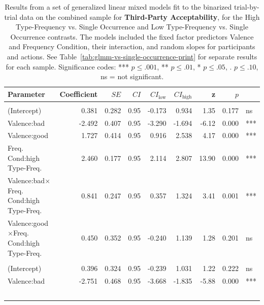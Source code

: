 \documentclass[
]{article}
\begin{document}
\begin{table}
\centering\centering
\caption{\label{tab:glmm-vs-single-occurrence-combined-print-third-party-acceptability}Results from a set of generalized linear mixed models fit to the binarized trial-by-trial data on the combined sample for \textbf{Third-Party Acceptability}, for the High Type-Frequency vs. Single Occurrence and Low Type-Frequency vs. Single Occurrence contrasts. The models included the fixed factor predictors Valence and Frequency Condition, their interaction, and random slopes for participants and actions. See Table~\ref{tab:glmm-vs-single-occurrence-print} for separate results for each sample. Significance codes: *** $p \leq .001$, ** $p \leq .01$, * $p \leq .05$, . $p \leq .10$, ns = not significant.}
\centering
\begin{tabular}[t]{lrrrrrrrl}
\toprule
Parameter & Coefficient & $\mathit{SE}$ & $C$$I$ & $CI_{\text{low}}$ & $CI_{\text{high}}$ & z & $p$ &  \\
\midrule
\addlinespace[0.3em]
\multicolumn{9}{l}{\textbf{High Type-Frequency (vs. Single Occurrence)}}\\
\hspace{1em}(Intercept) & 0.381 & 0.282 & 0.95 & -0.173 & 0.934 & 1.35 & 0.177 & ns\\
\hspace{1em}Valence:bad & -2.492 & 0.407 & 0.95 & -3.290 & -1.694 & -6.12 & 0.000 & ***\\
\hspace{1em}Valence:good & 1.727 & 0.414 & 0.95 & 0.916 & 2.538 & 4.17 & 0.000 & ***\\
Freq.
Cond:high
\hspace{1em}Type-Freq. & 2.460 & 0.177 & 0.95 & 2.114 & 2.807 & 13.90 & 0.000 & ***\\
Valence:bad$\times$Freq.
Cond:high
\hspace{1em}Type-Freq. & 0.841 & 0.247 & 0.95 & 0.357 & 1.324 & 3.41 & 0.001 & ***\\
Valence:good$\times$Freq.
Cond:high
\hspace{1em}Type-Freq. & 0.450 & 0.352 & 0.95 & -0.240 & 1.139 & 1.28 & 0.201 & ns\\
\addlinespace[0.3em]
\multicolumn{9}{l}{\textbf{Low Type-Frequency (vs. Single Occurrence)}}\\
\hspace{1em}(Intercept) & 0.396 & 0.324 & 0.95 & -0.239 & 1.031 & 1.22 & 0.222 & ns\\
\hspace{1em}Valence:bad & -2.751 & 0.468 & 0.95 & -3.668 & -1.835 & -5.88 & 0.000 & ***\\
$$
\end{tabular}
\end{table}
\end{document}
